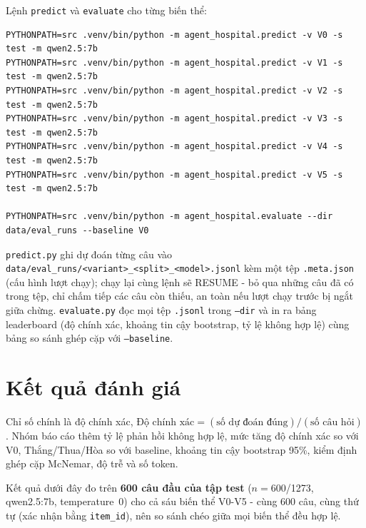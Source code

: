 \documentclass[11pt]{article}
\begin{document}
Lệnh \texttt{predict} và \texttt{evaluate} cho từng biến thể:

\begin{lstlisting}
PYTHONPATH=src .venv/bin/python -m agent_hospital.predict -v V0 -s test -m qwen2.5:7b
PYTHONPATH=src .venv/bin/python -m agent_hospital.predict -v V1 -s test -m qwen2.5:7b
PYTHONPATH=src .venv/bin/python -m agent_hospital.predict -v V2 -s test -m qwen2.5:7b
PYTHONPATH=src .venv/bin/python -m agent_hospital.predict -v V3 -s test -m qwen2.5:7b
PYTHONPATH=src .venv/bin/python -m agent_hospital.predict -v V4 -s test -m qwen2.5:7b
PYTHONPATH=src .venv/bin/python -m agent_hospital.predict -v V5 -s test -m qwen2.5:7b

PYTHONPATH=src .venv/bin/python -m agent_hospital.evaluate --dir data/eval_runs --baseline V0
\end{lstlisting}
\texttt{predict.py} ghi dự đoán từng câu vào \texttt{data/eval\_runs/<variant>\_<split>\_<model>.jsonl}
kèm một tệp \texttt{.meta.json} (cấu hình lượt chạy); chạy lại cùng lệnh sẽ RESUME - bỏ qua những câu
đã có trong tệp, chỉ chấm tiếp các câu còn thiếu, an toàn nếu lượt chạy trước bị ngắt giữa chừng.
\texttt{evaluate.py} đọc mọi tệp \texttt{.jsonl} trong \texttt{--dir} và in ra bảng leaderboard (độ
chính xác, khoảng tin cậy bootstrap, tỷ lệ không hợp lệ) cùng bảng so sánh ghép cặp với
\texttt{--baseline}.



\FloatBarrier
\section{Kết quả đánh giá}
\label{sec:results}
Chỉ số chính là độ chính xác, $\text{Độ chính xác} = (\text{số dự đoán đúng}) / (\text{số câu hỏi})$.
Nhóm báo cáo thêm tỷ lệ phản hồi không hợp lệ, mức tăng độ chính xác so với V0, Thắng/Thua/Hòa so với
baseline, khoảng tin cậy bootstrap 95\%, kiểm định ghép cặp McNemar, độ trễ và số token.

Kết quả dưới đây đo trên \textbf{600 câu đầu của tập test} ($n{=}600$/1273, qwen2.5:7b, temperature~0)
cho cả sáu biến thể V0-V5 - cùng 600 câu, cùng thứ tự (xác nhận bằng \texttt{item\_id}), nên so sánh
chéo giữa mọi biến thể đều hợp lệ.
\end{document}
